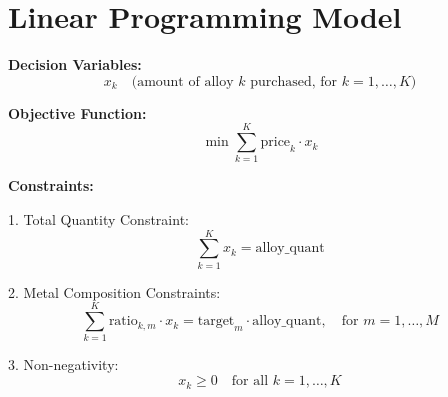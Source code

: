 \documentclass{article}
\begin{document}
\section*{Linear Programming Model}

\textbf{Decision Variables:}
\[
x_k \quad \text{(amount of alloy } k \text{ purchased, for } k = 1, \ldots, K)
\]

\textbf{Objective Function:}
\[
\min \sum_{k=1}^{K} \text{price}_k \cdot x_k
\]

\textbf{Constraints:}

1. Total Quantity Constraint:
\[
\sum_{k=1}^{K} x_k = \text{alloy\_quant}
\]

2. Metal Composition Constraints:
\[
\sum_{k=1}^{K} \text{ratio}_{k, m} \cdot x_k = \text{target}_m \cdot \text{alloy\_quant}, \quad \text{for } m = 1, \ldots, M
\]

3. Non-negativity:
\[
x_k \geq 0 \quad \text{for all } k=1, \ldots, K
\]
\end{document}
